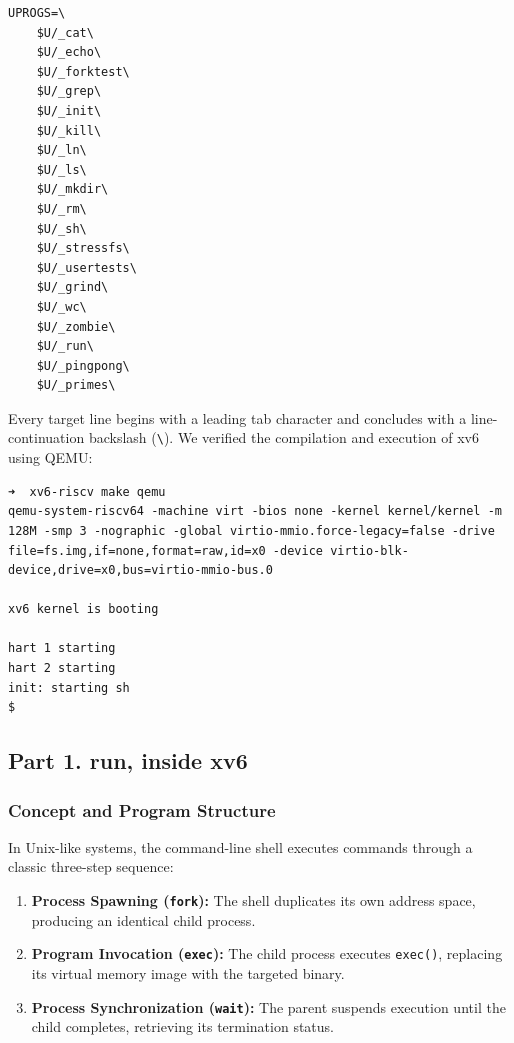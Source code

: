 \documentclass{labreport}
\begin{document}
\begin{lstlisting}[style=bash]
UPROGS=\
    $U/_cat\
    $U/_echo\
    $U/_forktest\
    $U/_grep\
    $U/_init\
    $U/_kill\
    $U/_ln\
    $U/_ls\
    $U/_mkdir\
    $U/_rm\
    $U/_sh\
    $U/_stressfs\
    $U/_usertests\
    $U/_grind\
    $U/_wc\
    $U/_zombie\
    $U/_run\
    $U/_pingpong\
    $U/_primes\
\end{lstlisting}

Every target line begins with a leading tab character and concludes with a line-continuation backslash (\texttt{\textbackslash}). We verified the compilation and execution of xv6 using QEMU:

\begin{lstlisting}[style=bash]
➜  xv6-riscv make qemu
qemu-system-riscv64 -machine virt -bios none -kernel kernel/kernel -m 128M -smp 3 -nographic -global virtio-mmio.force-legacy=false -drive file=fs.img,if=none,format=raw,id=x0 -device virtio-blk-device,drive=x0,bus=virtio-mmio-bus.0

xv6 kernel is booting

hart 1 starting
hart 2 starting
init: starting sh
$ 
\end{lstlisting}

\subsection{Part 1. run, inside xv6}

\subsubsection{Concept and Program Structure}
In Unix-like systems, the command-line shell executes commands through a classic three-step sequence:
\begin{enumerate}
    \item \textbf{Process Spawning (\texttt{fork}):} The shell duplicates its own address space, producing an identical child process.
    \item \textbf{Program Invocation (\texttt{exec}):} The child process executes \texttt{exec()}, replacing its virtual memory image with the targeted binary.
    \item \textbf{Process Synchronization (\texttt{wait}):} The parent suspends execution until the child completes, retrieving its termination status.
\end{enumerate}
\end{document}
